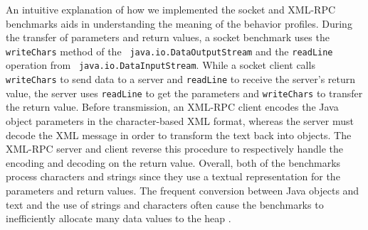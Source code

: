 \documentclass{sig-alternate}
\begin{document}






An intuitive explanation of how we implemented the socket and XML-RPC
benchmarks aids in understanding the meaning of the behavior profiles.
During the transfer of parameters and return values, a socket
benchmark uses the {\tt writeChars} method of the {\tt
  java.io.DataOutputStream} and the {\tt readLine} operation from {\tt
  java.io.DataInputStream}.  While a socket client calls {\tt
  writeChars} to send data to a server and {\tt readLine} to receive
the server's return value, the server uses {\tt readLine} to get the
parameters and {\tt writeChars} to transfer the return value.  Before
transmission, an XML-RPC client encodes the Java object parameters in
the character-based XML format, whereas the server must decode the XML
message in order to transform the text back into objects.  The XML-RPC
server and client reverse this procedure to respectively handle the
encoding and decoding on the return value.  Overall, both of the
benchmarks process characters and strings since they use a textual
representation for the parameters and return values.  The frequent
conversion between Java objects and text and the use of strings and
characters often cause the benchmarks to inefficiently allocate many
data values to the heap \cite{kawachiya-string-ineff}.
\end{document}
